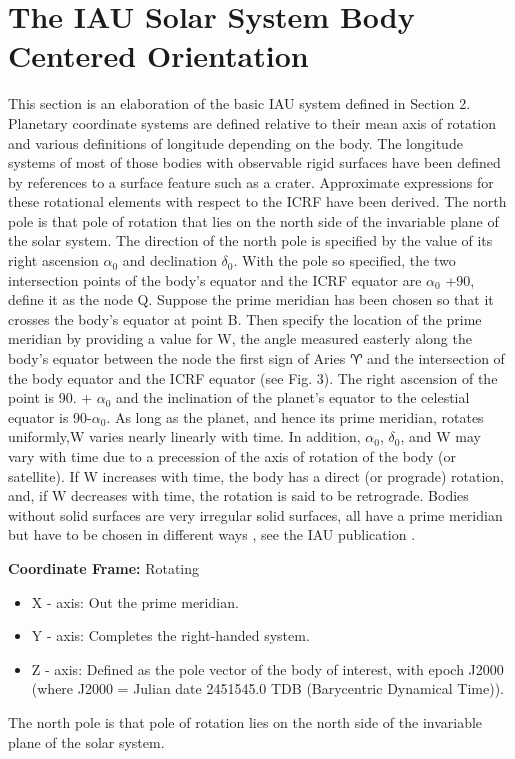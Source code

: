 \section{The IAU Solar System Body Centered Orientation } \label{sec:gendet} 
This section is an elaboration of the basic IAU system defined in Section 2.
Planetary coordinate systems are defined relative to their mean axis of rotation and various definitions of longitude depending on the body. The longitude systems of most of those bodies with observable rigid surfaces have been defined by references to a surface feature such as a crater. Approximate expressions for these rotational elements with respect to the ICRF have been derived. 
The north pole is that pole of rotation that lies on the north side of the invariable plane of the solar system. The direction of the north pole is specified by the value of its right ascension $\alpha_0$ and declination $\delta_0$. With the pole so specified, the two intersection points of the body's equator and the ICRF equator are $\alpha_0$ +90, define it as the node Q. Suppose the prime meridian has been chosen so that it crosses the body's equator at point B. Then specify the location of the prime meridian by providing a value for W, the angle measured easterly along the body's equator between the node the first sign of Aries $\aries$ and the intersection of the body equator and the ICRF equator (see Fig. 3). The right ascension of the point is 90. + $\alpha_0$ and the inclination of the planet's equator to the celestial equator is 90-$\alpha_0$. As long as the planet, and hence its prime meridian, rotates uniformly,W varies nearly linearly with time. In addition, $\alpha_0$, $\delta_0$, and W may vary with time due to a precession of the axis of rotation of the body (or satellite). If W increases with time, the body has a direct (or prograde) rotation, and, if W decreases with time, the rotation is said to be retrograde.
Bodies without solid surfaces are very irregular solid surfaces, all have a prime meridian but have to be chosen in different ways , see the IAU publication \cite{IAU2006}.

\textbf{Coordinate Frame: } Rotating

\begin{itemize}
\item X - axis: Out the prime meridian.
\item Y - axis: Completes the right-handed system.
\item Z - axis: Defined as the pole vector of the body of interest, with epoch J2000 (where J2000 = Julian date 2451545.0 TDB (Barycentric Dynamical Time)). 
\end{itemize}
The north pole is that pole of rotation lies on the north side of the invariable plane of the solar system.

